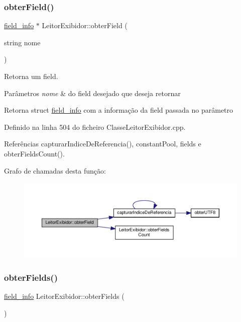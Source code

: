 \subsubsection{\texorpdfstring{obter\+Field()}{obterField()}}
{\footnotesize\ttfamily \hyperlink{structfield__info}{field\+\_\+info} $\ast$ Leitor\+Exibidor\+::obter\+Field (\begin{DoxyParamCaption}\item[{string}]{nome }\end{DoxyParamCaption})}



Retorna um field. 


\begin{DoxyParams}{Parâmetros}
{\em nome} & do field desejado que deseja retornar \\
\hline
\end{DoxyParams}
\begin{DoxyReturn}{Retorna}
struct \hyperlink{structfield__info}{field\+\_\+info} com a informação da field passada no parâmetro 
\end{DoxyReturn}


Definido na linha 504 do ficheiro Classe\+Leitor\+Exibidor.\+cpp.



Referências capturar\+Indice\+De\+Referencia(), constant\+Pool, fields e obter\+Fields\+Count().

Grafo de chamadas desta função\+:
\nopagebreak
\begin{figure}[H]
\begin{center}
\leavevmode
\includegraphics[width=350pt]{classLeitorExibidor_af51949669ace432f66221710ef3a3b00_cgraph}
\end{center}
\end{figure}
\mbox{\label{classLeitorExibidor_a480bbed0d19b7cf5d64753c9c1210464}} 
\subsubsection{\texorpdfstring{obter\+Fields()}{obterFields()}}
{\footnotesize\ttfamily \hyperlink{structfield__info}{field\+\_\+info} Leitor\+Exibidor\+::obter\+Fields (\begin{DoxyParamCaption}{ }\end{DoxyParamCaption})}



